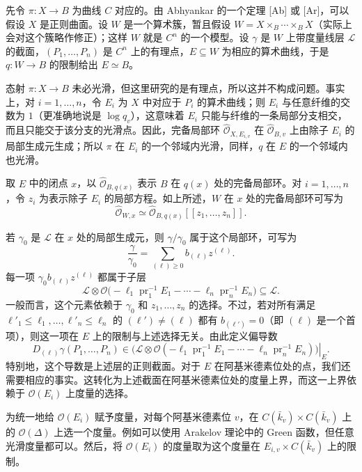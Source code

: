 先令 $\pi:X\to B$ 为曲线 $C$ 对应的。由 Abhyankar 的一个定理 [Ab] 或 [Ar]，可以假设 $X$ 是正则曲面。设 $W$ 是一个算术簇，暂且假设 $W=X\times_B\cdots\times_BX$（实际上会对这个簇略作修正）；这样 $W$ 就是 $C^n$ 的一个模型。设 $\gamma$ 是 $W$ 上带度量线层 $\mathscr L$ 的截面，$(P_1,\ldots,P_n)$ 是 $C^n$ 上的有理点，$E\subseteq W$ 为相应的算术曲线，于是 $q:W\to B$ 的限制给出 $E\simeq B$。

态射 $\pi:X\to B$ 未必光滑，但这里研究的是有理点，所以这并不构成问题。事实上，对 $i=1,\ldots,n$，令 $E_i$ 为 $X$ 中对应于 $P_i$ 的算术曲线；则 $E_i$ 与任意纤维的交数为 $1$（更准确地说是 $\log q_v$），这意味着 $E_i$ 只能与纤维的一条局部分支相交，而且只能交于该分支的光滑点。因此，完备局部环 $\widehat{\mathcal O}_{X,E_{i,v}}$ 在 $\widehat{\mathcal O}_{B,v}$ 上由除子 $E_i$ 的局部生成元生成；所以 $\pi$ 在 $E_i$ 的一个邻域内光滑，同样，$q$ 在 $E$ 的一个邻域内也光滑。

取 $E$ 中的闭点 $x$，以 $\widehat{\mathcal O}_{B,q(x)}$ 表示 $B$ 在 $q(x)$ 处的完备局部环。对 $i=1,\ldots,n$，令 $z_i$ 为表示除子 $E_i$ 的局部方程。如上所述，$W$ 在 $x$ 处的完备局部环可写为
\[
\widehat{\mathcal O}_{W,x}\simeq
\widehat{\mathcal O}_{B,q(x)}[[z_1,\ldots,z_n]].
\]

若 $\gamma_0$ 是 $\mathscr L$ 在 $x$ 处的局部生成元，则 $\gamma/\gamma_0$ 属于这个局部环，可写为
\[
\frac\gamma{\gamma_0}=\sum_{(\ell)\ge0}b_{(\ell)}z^{(\ell)}.
\]
每一项 $\gamma_0b_{(\ell)}z^{(\ell)}$ 都属于子层
\[
\mathscr L\otimes\mathcal O\bigl(-\ell_1\operatorname{pr}_1^{-1}E_1-\cdots-\ell_n\operatorname{pr}_n^{-1}E_n\bigr)
\subseteq\mathscr L.
\]
一般而言，这个元素依赖于 $\gamma_0$ 和 $z_1,\ldots,z_n$ 的选择。不过，若对所有满足 $\ell'_1\le\ell_1,\ldots,\ell'_n\le\ell_n$ 的 $(\ell')\ne(\ell)$ 都有 $b_{(\ell')}=0$（即 $(\ell)$ 是一个首项），则这一项在 $E$ 上的限制与上述选择无关。由此定义偏导数
\[
D_{(\ell)}\gamma(P_1,\ldots,P_n)\in
\left.\bigl(\mathscr L\otimes\mathcal O(-\ell_1\operatorname{pr}_1^{-1}E_1-\cdots-\ell_n\operatorname{pr}_n^{-1}E_n)\bigr)\right|_E.
\]
特别地，这个导数是上述层的正则截面。对于 $E$ 在阿基米德素位处的点，我们还需要相应的事实。这转化为上述截面在阿基米德素位处的度量上界，而这一上界依赖于 $\mathcal O(E_i)$ 上度量的选择。

为统一地给 $\mathcal O(E_i)$ 赋予度量，对每个阿基米德素位 $v$，在 $C(\bar k_v)\times C(\bar k_v)$ 上的 $\mathcal O(\Delta)$ 上选一个度量。例如可以使用 Arakelov 理论中的 Green 函数，但任意光滑度量都可以。然后，将 $\mathcal O(E_i)$ 的度量取为这个度量在 $E_{i,v}\times C(\bar k_v)$ 上的限制。

